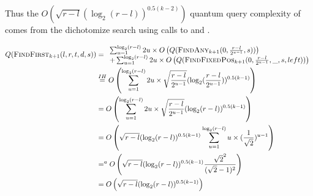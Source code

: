\begin{appendix}
\begin{tproof}
{            Thus the $O \left(\sqrt{r-l}(\log_2(r-l))^{0.5(k-2)}\right)$ quantum query complexity of  comes
            from the dichotomize search using calls to  and .


            \begin{align*}
                Q(\textrm{\textsc{FindFirst$_{k+1}$}}(l,r,t,d,s)) & = \begin{array}{l}
                    \sum_{u=1}^{\log_2(r-l)}2u \times O\left(Q(\textrm{\textsc{FindAny$_{k+1}$}}(0, \frac{r-l}{2^{u-1}}, s))\right) \\
                    + \sum_{u=1}^{\log_2(r-l)}2u \times O\left(Q(\textrm{\textsc{FindFixedPos$_{k+1}$}}(0, \frac{r-l}{2^{u-1}}, \_ , s, left))\right)
                \end{array}                                                     \\
                                                & \overset{IH}{=}
                O\left(\sum_{u=1}^{\log_2(r-l)}2u \times \sqrt{\frac{r-l}{2^{u-1}}}(\log_2(\frac{r-l}{2^{u-1}}))^{0.5(k-1)}\right) \\
                                                & =
                O\left(\sum_{u=1}^{\log_2(r-l)}2u \times \sqrt{\frac{r-l}{2^{u-1}}}(\log_2(r-l))^{0.5(k-1)}\right)                 \\
                                                & =
                O \left(\sqrt{r-l}(\log_2(r-l))^{0.5(k-1)}\sum_{u=1}^{\log_2(r-l)}u\times (\frac{1}{\sqrt{2}})^{u-1} \right)       \\
                                                & =^{a}
                O \left(\sqrt{r-l}(\log_2(r-l))^{0.5(k-1)} \frac{\sqrt{2}^2}{(\sqrt{2}-1)^2}\right)                                \\
                                                & =
                O \left(\sqrt{r-l}(\log_2(r-l))^{0.5(k-1)}\right)
            \end{align*}


}
\end{tproof}
\end{appendix}
